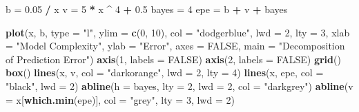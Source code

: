 \documentclass[]{report}
\newenvironment{Shaded}{\begin{snugshade}}{\end{snugshade}}
\newcommand{\KeywordTok}[1]{\textcolor[rgb]{0.13,0.29,0.53}{\textbf{#1}}}
\newcommand{\DataTypeTok}[1]{\textcolor[rgb]{0.13,0.29,0.53}{#1}}
\newcommand{\DecValTok}[1]{\textcolor[rgb]{0.00,0.00,0.81}{#1}}
\newcommand{\FloatTok}[1]{\textcolor[rgb]{0.00,0.00,0.81}{#1}}
\newcommand{\StringTok}[1]{\textcolor[rgb]{0.31,0.60,0.02}{#1}}
\newcommand{\OtherTok}[1]{\textcolor[rgb]{0.56,0.35,0.01}{#1}}
\newcommand{\OperatorTok}[1]{\textcolor[rgb]{0.81,0.36,0.00}{\textbf{#1}}}
\newcommand{\NormalTok}[1]{#1}
\begin{document}
\begin{Shaded}
\begin{Highlighting}[]
\NormalTok{b =}\StringTok{ }\FloatTok{0.05} \OperatorTok{/}\StringTok{ }\NormalTok{x}
\NormalTok{v =}\StringTok{ }\DecValTok{5} \OperatorTok{*}\StringTok{ }\NormalTok{x }\OperatorTok{^}\StringTok{ }\DecValTok{4} \OperatorTok{+}\StringTok{ }\FloatTok{0.5}
\NormalTok{bayes =}\StringTok{ }\DecValTok{4}
\NormalTok{epe =}\StringTok{ }\NormalTok{b }\OperatorTok{+}\StringTok{ }\NormalTok{v }\OperatorTok{+}\StringTok{ }\NormalTok{bayes}

\KeywordTok{plot}\NormalTok{(x, b, }\DataTypeTok{type =} \StringTok{"l"}\NormalTok{, }\DataTypeTok{ylim =} \KeywordTok{c}\NormalTok{(}\DecValTok{0}\NormalTok{, }\DecValTok{10}\NormalTok{), }\DataTypeTok{col =} \StringTok{"dodgerblue"}\NormalTok{, }\DataTypeTok{lwd =} \DecValTok{2}\NormalTok{, }\DataTypeTok{lty =} \DecValTok{3}\NormalTok{,}
     \DataTypeTok{xlab =} \StringTok{"Model Complexity"}\NormalTok{, }\DataTypeTok{ylab =} \StringTok{"Error"}\NormalTok{, }\DataTypeTok{axes =} \OtherTok{FALSE}\NormalTok{,}
     \DataTypeTok{main =} \StringTok{"Decomposition of Prediction Error"}\NormalTok{)}
\KeywordTok{axis}\NormalTok{(}\DecValTok{1}\NormalTok{, }\DataTypeTok{labels =} \OtherTok{FALSE}\NormalTok{)}
\KeywordTok{axis}\NormalTok{(}\DecValTok{2}\NormalTok{, }\DataTypeTok{labels =} \OtherTok{FALSE}\NormalTok{)}
\KeywordTok{grid}\NormalTok{()}
\KeywordTok{box}\NormalTok{()}
\KeywordTok{lines}\NormalTok{(x, v, }\DataTypeTok{col =} \StringTok{"darkorange"}\NormalTok{, }\DataTypeTok{lwd =} \DecValTok{2}\NormalTok{, }\DataTypeTok{lty =} \DecValTok{4}\NormalTok{)}
\KeywordTok{lines}\NormalTok{(x, epe, }\DataTypeTok{col =} \StringTok{"black"}\NormalTok{, }\DataTypeTok{lwd =} \DecValTok{2}\NormalTok{)}
\KeywordTok{abline}\NormalTok{(}\DataTypeTok{h =}\NormalTok{ bayes, }\DataTypeTok{lty =} \DecValTok{2}\NormalTok{, }\DataTypeTok{lwd =} \DecValTok{2}\NormalTok{, }\DataTypeTok{col =} \StringTok{"darkgrey"}\NormalTok{)}
\KeywordTok{abline}\NormalTok{(}\DataTypeTok{v =}\NormalTok{ x[}\KeywordTok{which.min}\NormalTok{(epe)], }\DataTypeTok{col =} \StringTok{"grey"}\NormalTok{, }\DataTypeTok{lty =} \DecValTok{3}\NormalTok{, }\DataTypeTok{lwd =} \DecValTok{2}\NormalTok{)}
\end{Highlighting}
\end{Shaded}
\end{document}
